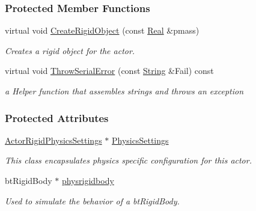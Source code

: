 \subsubsection*{Protected Member Functions}
\begin{DoxyCompactItemize}
\item 
virtual void \hyperlink{classphys_1_1ActorRigid_a3d50613a6992e7de6a09d3e710d83b60}{CreateRigidObject} (const \hyperlink{namespacephys_af7eb897198d265b8e868f45240230d5f}{Real} \&pmass)
\begin{DoxyCompactList}\small\item\em Creates a rigid object for the actor. \item\end{DoxyCompactList}\item 
virtual void \hyperlink{classphys_1_1ActorRigid_ac252b319fefc3f7470feb73e3866661b}{ThrowSerialError} (const \hyperlink{namespacephys_aa03900411993de7fbfec4789bc1d392e}{String} \&Fail) const 
\begin{DoxyCompactList}\small\item\em a Helper function that assembles strings and throws an exception \item\end{DoxyCompactList}\end{DoxyCompactItemize}
\subsubsection*{Protected Attributes}
\begin{DoxyCompactItemize}
\item 
\hypertarget{classphys_1_1ActorRigid_af86eb5347cb6bb31a561404efc3d8245}{
\hyperlink{classphys_1_1ActorRigidPhysicsSettings}{ActorRigidPhysicsSettings} $\ast$ \hyperlink{classphys_1_1ActorRigid_af86eb5347cb6bb31a561404efc3d8245}{PhysicsSettings}}
\label{classphys_1_1ActorRigid_af86eb5347cb6bb31a561404efc3d8245}

\begin{DoxyCompactList}\small\item\em This class encapsulates physics specific configuration for this actor. \item\end{DoxyCompactList}\item 
\hypertarget{classphys_1_1ActorRigid_a690889f942e177644f4f8521f509c88d}{
btRigidBody $\ast$ \hyperlink{classphys_1_1ActorRigid_a690889f942e177644f4f8521f509c88d}{physrigidbody}}
\label{classphys_1_1ActorRigid_a690889f942e177644f4f8521f509c88d}

\begin{DoxyCompactList}\small\item\em Used to simulate the behavior of a btRigidBody. \item\end{DoxyCompactList}\end{DoxyCompactItemize}
